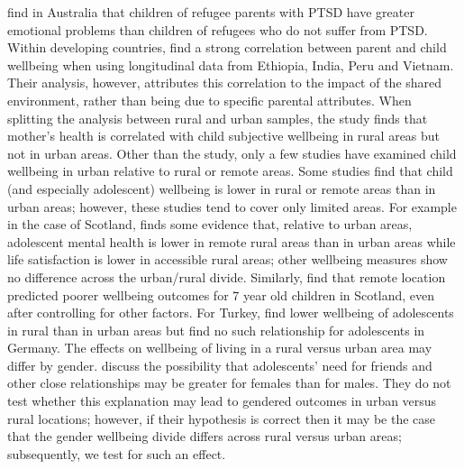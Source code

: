 \documentclass[10pt, letterpaper]{article}
\begin{document}
\begin{spacing}{1.4}
\citet{bryant2018} find in Australia that children of refugee parents with PTSD
have greater emotional problems than children of refugees who do not suffer from
PTSD. Within developing countries, \citet{borga2022} find a strong correlation
between parent and child wellbeing when using longitudinal data from Ethiopia,
India, Peru and Vietnam. Their analysis, however,  attributes this correlation to the impact of the shared environment, rather than being due to specific parental attributes. When splitting the analysis between rural and urban samples, the study finds that mother's health is correlated with child subjective wellbeing in rural areas but not in urban areas.
Other than the \citet{borga2022} study, only a few studies have examined child
wellbeing in urban relative to rural or remote areas. Some studies find that
child (and especially adolescent) wellbeing is lower in rural or remote areas
than in urban areas; however, these studies tend to cover only limited areas. For example in the case of Scotland, \citet{levin2014} finds some evidence that, relative to urban areas, adolescent mental health is lower in remote rural areas than in urban areas while life satisfaction is lower in accessible rural areas; other wellbeing measures show no difference across the urban/rural divide. Similarly, \citet{parkes2016} find that remote location predicted poorer wellbeing outcomes for 7 year old children in Scotland, even after controlling for other factors. For Turkey, \citet{yeresyan2014} find lower wellbeing of adolescents in rural than in urban areas but find no such relationship for adolescents in Germany. 
The effects on wellbeing of living in a rural versus urban area may differ by
gender. \citet{powdthavee2008} discuss the possibility that adolescents' need
for friends and other close relationships may be greater for females than for
males. They do not test whether this explanation may lead to gendered outcomes
in urban versus rural locations; however, if their hypothesis is correct then it
may be the case that the gender wellbeing divide differs across rural versus
urban areas; subsequently, we test for such an effect.


\end{spacing}
\end{document}
